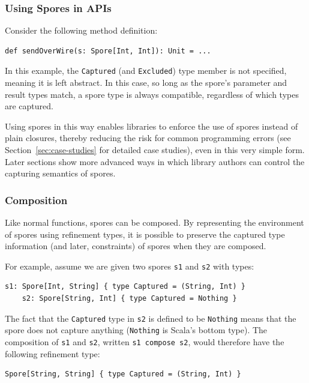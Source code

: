\documentclass[runningheads]{llncs}
\begin{document}
\begin{sloppypar}
\subsubsection{Using Spores in APIs}

Consider the following method definition:

\begin{lstlisting}[numbers=none]
    def sendOverWire(s: Spore[Int, Int]): Unit = ...
\end{lstlisting}
\noindent
In this example, the \verb|Captured| (and \verb|Excluded|) type
member is not specified, meaning it is left abstract. In this case, so long as
the spore's parameter and result types match, a spore type is always
compatible, regardless of which types are captured.

Using spores in this way enables libraries to enforce the use
of spores instead of plain closures, thereby reducing the risk for common
programming errors (see Section~\ref{sec:case-studies} for detailed case
studies), even in this very simple form. Later sections show more
advanced ways in which library authors can control the capturing semantics of
spores.

\subsubsection{Composition}

Like normal functions, spores can be composed. By representing the environment
of spores using refinement types, it is possible to preserve the captured type
information (and later, constraints) of spores when they are composed.

For example, assume we are given two spores \verb|s1| and \verb|s2| with types:

\begin{lstlisting}[numbers=none]
    s1: Spore[Int, String] { type Captured = (String, Int) }
    s2: Spore[String, Int] { type Captured = Nothing }
\end{lstlisting}

\noindent The fact that the \verb|Captured| type in \verb|s2| is defined to be
\verb|Nothing| means that the spore does not capture anything (\verb|Nothing|
is Scala's bottom type). The composition of \verb|s1| and \verb|s2|, written
\verb|s1 compose s2|, would therefore have the following refinement type:

\begin{lstlisting}[numbers=none]
    Spore[String, String] { type Captured = (String, Int) }
\end{lstlisting}


\end{sloppypar}
\end{document}
